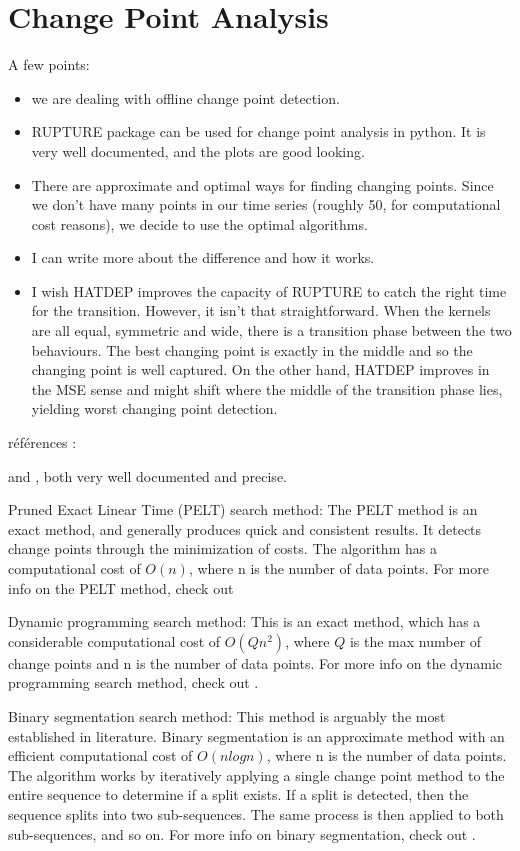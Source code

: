 \chapter{Change Point Analysis}
\label{chap:change_point}

A few points:

\begin{itemize}
\item we are dealing with offline change point detection.
\item RUPTURE package can be used for change point analysis in python. It is very well documented, and the plots are good looking.
\item There are approximate and optimal ways for finding changing points. Since we don't have many points in our time series (roughly 50, for computational cost reasons), we decide to use the optimal algorithms.
\item I can write more about the difference and how it works.
\item I wish HATDEP improves the capacity of RUPTURE to catch the right time for the transition. However, it isn't that straightforward. When the kernels are all equal, symmetric and wide, there is a transition phase between the two behaviours. The best changing point is exactly in the middle and so the changing point is well captured. On the other hand, HATDEP improves in the MSE sense and might shift where the middle of the transition phase lies, yielding worst changing point detection.
\end{itemize}

références :

\cite{change_point_detection_these} and \cite{rupture_docu}, both very well documented and precise.

Pruned Exact Linear Time (PELT) search method: The PELT method is an exact method, and generally produces quick and consistent results. It detects change points through the minimization of costs. The algorithm has a computational cost of $O(n)$, where n is the number of data points. For more info on the PELT method, check out \cite{PELT_docu}

Dynamic programming search method: This is an exact method, which has a considerable computational cost of $O(Qn^2 )$, where $Q$ is the max number of change points and n is the number of data points. For more info on the dynamic programming search method, check out \cite{rupture_docu}.

Binary segmentation search method: This method is arguably the most established in literature. Binary segmentation is an approximate method with an efficient computational cost of $O (n log n)$, where n is the number of data points. The algorithm works by iteratively applying a single change point method to the entire sequence to determine if a split exists. If a split is detected, then the sequence splits into two sub-sequences. The same process is then applied to both sub-sequences, and so on. For more info on binary segmentation, check out \cite{binary_segmentation_change_point}.

